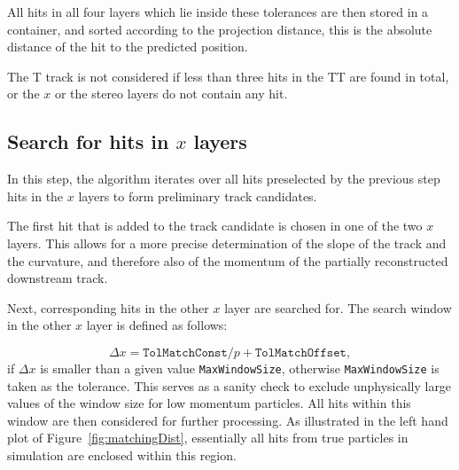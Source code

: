 All hits in all four layers which lie inside these tolerances are then stored in a container, and
sorted according to the projection distance, this is the absolute distance of the hit to the predicted position.

The T track is not considered if less than three hits in the TT are found in
total, or the $x$ or the stereo layers do not contain any hit.


\subsection[Search for hits in $x$ layers]{Search for hits in {\boldmath $x$} layers}
In this step, the algorithm iterates over all hits preselected by the previous step hits in the $x$ layers to form preliminary track candidates.  

The first hit that is added to the track candidate is chosen in one of the two $x$ layers. This allows for a more precise
determination of the slope of the track and the curvature, and therefore also of the momentum of
the partially reconstructed downstream track.

 Next, corresponding hits in the other $x$ layer are
searched for. The search window in the other $x$ layer is defined as follows:

\begin{equation}
\Delta x =  \texttt{TolMatchConst} / p + \texttt{TolMatchOffset} ,
\end{equation}
if $\Delta x$ is smaller than a given value \texttt{MaxWindowSize}, otherwise
\texttt{MaxWindowSize} is taken as the tolerance. This serves as a sanity check
to exclude unphysically large values of the window size for low momentum
particles. All hits within this window are then considered for further
processing. As illustrated in the left hand plot of Figure~\ref{fig:matchingDist}, 
essentially all hits from true particles
in simulation are enclosed within this region.

